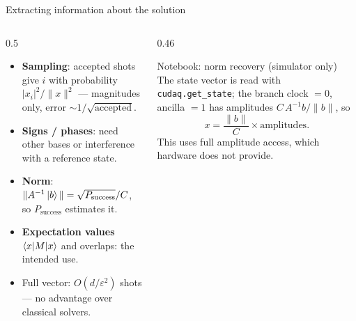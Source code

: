 \documentclass[aspectratio=169,11pt]{beamer}
\newcommand{\key}[1]{{\color{qdark}\textbf{#1}}}
\begin{document}
\begin{frame}{Extracting information about the solution}
  \begin{columns}[T]
    \begin{column}{0.5\textwidth}
      \small
      \begin{itemize}
        \item \key{Sampling}: accepted shots give $i$ with probability $|x_i|^2/\|x\|^2$ --- magnitudes only, error $\sim1/\sqrt{\text{accepted}}$.
        \item \key{Signs / phases}: need other bases or interference with a reference state.
        \item \key{Norm}: $\|A^{-1}\ket b\| = \sqrt{P_{\text{success}}}/C$, so $P_{\text{success}}$ estimates it.
        \item \key{Expectation values} $\braket{x|M|x}$ and overlaps: the intended use.
        \item Full vector: $O(d/\varepsilon^2)$ shots --- no advantage over classical solvers.
      \end{itemize}
    \end{column}
    \begin{column}{0.46\textwidth}
      \begin{block}{Notebook: norm recovery (simulator only)}
        The state vector is read with \texttt{cudaq.get\_state}; the branch clock $= 0$, ancilla $= 1$ has amplitudes $C\,A^{-1}b/\|b\|$, so
        \[ x = \frac{\|b\|}{C}\times\text{amplitudes}. \]
        This uses full amplitude access, which hardware does not provide.
      \end{block}
    \end{column}
  \end{columns}
\end{frame}
\end{document}
